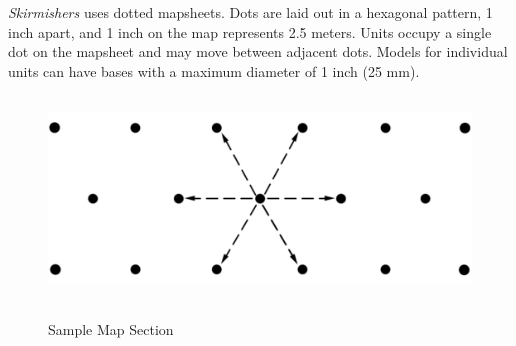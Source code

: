 \emph{Skirmishers} uses dotted mapsheets.
Dots are laid out in a hexagonal pattern, 1 inch apart, and 1 inch on the map represents 2.5 meters.
Units occupy a single dot on the mapsheet and may move between adjacent dots.
Models for individual units can have bases with a maximum diameter of 1 inch (25 mm).

\begin{figure}[H]
  \centering
  \includegraphics[alt='Sample dotted mapsheet', width=5.25in, height=2.15in]{img/Map.png}
  \caption*{Sample Map Section}
\end{figure}
